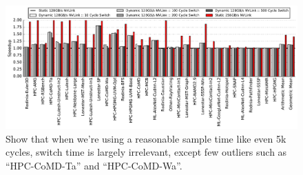 






\begin{figure}[tp]
    \centering
    \includegraphics[width=1.0\textwidth]{figures/plot_nvlink_switch_time_sample_time5000.pdf}
    \caption{Show that when we're using a reasonable sample time like even 5k 
cycles, switch time is largely irrelevant, except few 
outliers such as ``HPC-CoMD-Ta'' and ``HPC-CoMD-Wa''.}
    \label{fig:switchtime}
\end{figure}